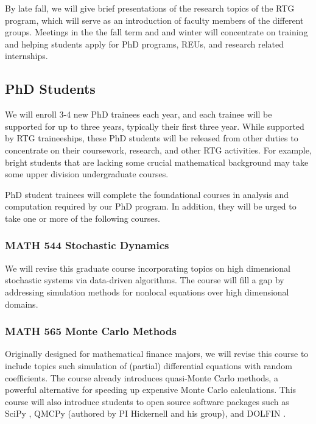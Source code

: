 \documentclass[11pt]{NSFamsart}
\begin{document}
By late fall, we will give brief presentations of the research topics of the RTG program, which will serve as an introduction of faculty members of the different
groups. Meetings in the the fall term and and winter will concentrate on training and helping students apply for PhD programs, REUs, and research related internships. 



\subsection*{PhD Students}


We will enroll 3-4 new PhD trainees each year, and each trainee will be supported for up to three years, typically their first three year.  While supported by RTG traineeships, these PhD students will be released from other duties to concentrate on their coursework, research, and other RTG activities.  For example, bright students that are lacking some crucial mathematical background may take some upper division undergraduate courses.  

PhD student trainees will complete the foundational courses in analysis and computation required by our PhD program.  In addition, they will be urged to take one or more of the following courses.

\subsubsection*{MATH 544 Stochastic Dynamics}
We will revise this graduate course  incorporating topics on  high dimensional stochastic systems via data-driven algorithms.  The course will fill a gap by addressing simulation methods for nonlocal equations over high dimensional domains.

\subsubsection*{MATH 565 Monte Carlo Methods} Originally designed for mathematical finance majors, we will revise this course to include topics such simulation of (partial) differential equations with random coefficients.  The course already introduces quasi-Monte Carlo methods, a powerful alternative for speeding up expensive Monte Carlo calculations.  This course will also introduce students to open source software packages such as SciPy \cite{virtanen2020scipy}, QMCPy \cite{QMCPy2020a} (authored by PI Hickernell and his group), and DOLFIN \cite{Dolphin12}. 
\end{document}
